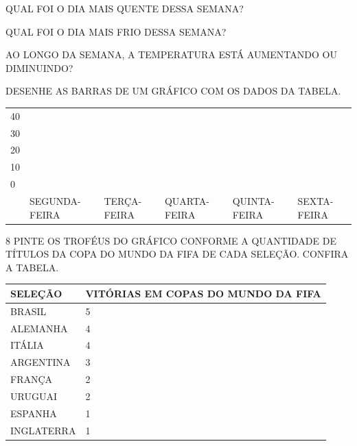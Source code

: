 \begin{escolha}
\item QUAL FOI O DIA MAIS QUENTE DESSA SEMANA?


\item QUAL FOI O DIA MAIS FRIO DESSA SEMANA?


\item AO LONGO DA SEMANA, A TEMPERATURA ESTÁ AUMENTANDO OU DIMINUINDO?


\item DESENHE AS BARRAS DE UM GRÁFICO COM OS DADOS DA TABELA.

\begin{longtable}[]{@{}llllll@{}}
\toprule
40 & & & & &\tabularnewline
30 & & & & &\tabularnewline
20 & & & & &\tabularnewline
10 & & & & &\tabularnewline
0 & & & & &\tabularnewline
& SEGUNDA-FEIRA & TERÇA-FEIRA & QUARTA-FEIRA & QUINTA-FEIRA & SEXTA-FEIRA\tabularnewline
\bottomrule
\end{longtable}

\end{escolha}


\num{8} PINTE OS TROFÉUS DO GRÁFICO CONFORME A QUANTIDADE DE TÍTULOS DA COPA DO
MUNDO DA FIFA DE CADA SELEÇÃO. CONFIRA A TABELA.

\begin{longtable}[]{@{}ll@{}}
\toprule
SELEÇÃO & VITÓRIAS EM COPAS DO MUNDO DA FIFA\tabularnewline
\midrule
\endhead
BRASIL & 5\tabularnewline
ALEMANHA & 4\tabularnewline
ITÁLIA & 4\tabularnewline
ARGENTINA & 3\tabularnewline
FRANÇA & 2\tabularnewline
URUGUAI & 2\tabularnewline
ESPANHA & 1\tabularnewline
INGLATERRA & 1\tabularnewline
\bottomrule
\end{longtable}


